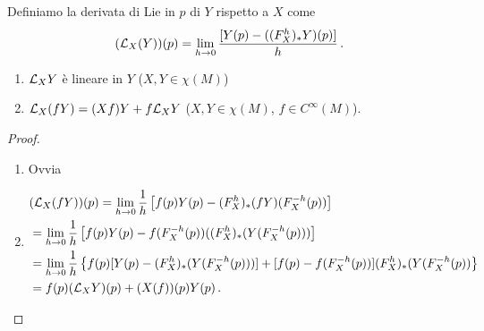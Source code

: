 \begin{definition}
	Definiamo la derivata di Lie in $p$ di $Y$ rispetto a $X$ come \begin{equation*}(\mathcal L_X(Y))(p)=\lim_{h\to 0}\frac{[Y(p)-((F_X^h)_*Y)(p)]}h \, \text{. }
	\end{equation*}
\end{definition}

\begin{proposition}
	\begin{enumerate}
		\item $\mathcal L_XY$ è lineare in $Y$ ($X,Y\in\chi(M)$)
		\item $\mathcal L_X(fY)=(Xf)Y+f\mathcal L_XY$ ($X,Y\in\chi(M)$, $f\in C^\infty(M)$).
	\end{enumerate}
\end{proposition}

\begin{proof}
	\begin{enumerate}
	 \item Ovvia
	 \item 
	 \begin{equation*}
	 \begin{split}
	 &(\mathcal L_X(fY))(p)=\lim_{h\to 0} \frac 1h \left[f(p)Y(p)-(F_X^h)_*(fY)(F_X^{-h}(p))\right]\\
	 &=\lim_{h\to 0}\frac 1h \left[f(p)Y(p)-f(F_X^{-h}(p)) ((F_X^h)_*(Y(F_X^{-h}(p)))\right]\\
	 &=\lim_{h\to 0}\frac 1h \left\{f(p)[Y(p)-(F_X^h)_*(Y(F_X^{-h}(p)))]+[f(p)-f(F_X^{-h}(p))](F_X^h)_*(Y(F_X^{-h}(p))\right\}\\
	 &=f(p)(\mathcal L_XY)(p)+(X(f))(p)Y(p) \, \text{. }
	 \end{split}
	 \end{equation*}
	 \end{enumerate}

\end{proof}




